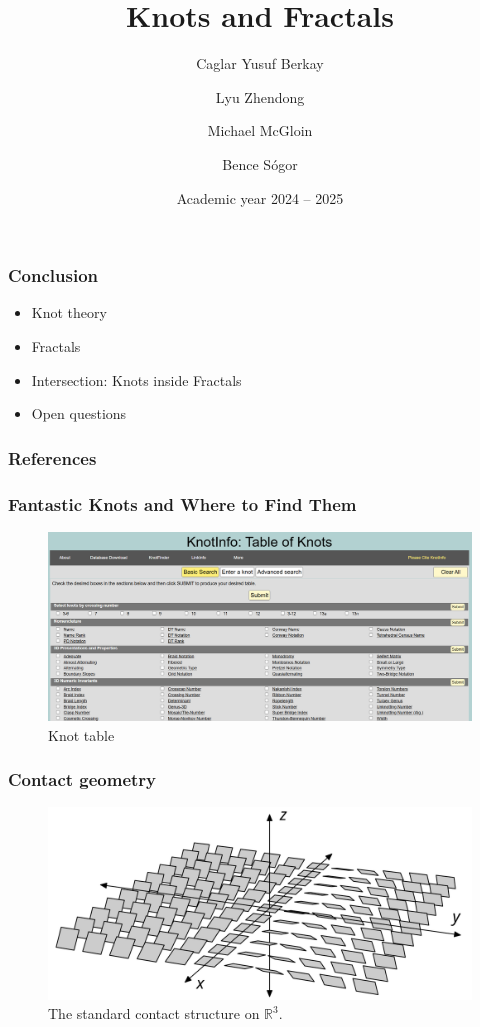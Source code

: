 \documentclass
   [kul] %
   {style/kulakbeamer}
\title{Knots and Fractals}
\author[Short name]{Caglar Yusuf Berkay \and Lyu Zhendong \and Michael McGloin \and Bence Sógor}
\institute{KU Leuven}
\date{Academic year 2024 -- 2025}
\begin{document}
\begin{titleframe}
\titlepage
\end{titleframe}

\begin{outlineframe}[Outline] %
\tableofcontents
\end{outlineframe}











\begin{frame}
\frametitle{Conclusion} %
\begin{itemize}
	\item Knot theory
	\item Fractals
	\item Intersection: Knots inside Fractals
	\item Open questions
\end{itemize}
\end{frame}


\begin{frame}[allowframebreaks]
    \frametitle{References}
%    
     \printbibliography
\end{frame}

\begin{frame}
	\frametitle{Fantastic Knots and Where to Find Them}
	\begin{figure}[h]
		\centering
		\includegraphics[width=0.8\linewidth]{images/KnotTable}
		\caption{Knot table \cite{knotinfo}}
		\label{fig:enter-label}
	\end{figure}
\end{frame}

\begin{frame}
	\frametitle{Contact geometry}
	\begin{figure}[h]
		\centering
		\includegraphics[width=0.8\linewidth]{images/ContactStructure}
		\caption{The standard contact structure on $\mathbb{R}^3.$ \cite{enwiki:1262008950}}
		\label{fig:enter-label}
	\end{figure}
\end{frame}
\end{document}
